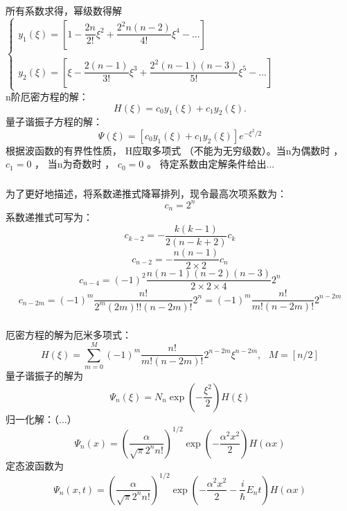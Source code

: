 \begin{frame}
	\frametitle{}
	所有系数求得，幂级数得解\\
	$\displaystyle \begin{cases}
		y_1(\xi)  = [1- \dfrac{2n}{2!} \xi^2+ \dfrac{2^2n(n-2)}{4!} \xi^4 -...  ] \\
		\\
		y_2(\xi)  = [\xi- \dfrac{2(n-1)}{3!} \xi^3+ \dfrac{2^2(n-1)(n-3) }{5!}\xi^5 -...  ]
	\end{cases}$ \\
	n阶厄密方程的解：
	\begin{equation*}
		H(\xi) =c_0y_1(\xi)+c_1 y_2(\xi).
	\end{equation*}   
 	 量子谐振子方程的解：
	\begin{equation*}
		\Psi(\xi) = [c_0y_1(\xi)+c_1 y_2(\xi) ]e^{-\xi^2/2 }  
  	\end{equation*}   
  	根据波函数的有界性性质， H应取多项式 （不能为无穷级数）。当n为偶数时 ， $c_1=0$ ， 当n为奇数时 ， $c_0=0$ 。 待定系数由定解条件给出...
\end{frame}

\begin{frame}
	\frametitle{}
		为了更好地描述，将系数递推式降幂排列，现令最高次项系数为：
	\begin{equation*}
		c_n =2^n
	\end{equation*}  
	系数递推式可写为：
	\begin{equation*}
		c_{k-2} = -\frac{k(k-1) } { 2(n-k+2)}  c_k
	\end{equation*} 
	\begin{equation*}
		c_{n-2} = -\frac{n(n-1) } { 2\times2}  c_n
	\end{equation*} 
	\begin{equation*}
		c_{n-4} = (-1)^2 \frac{n(n-1)(n-2) (n-3) } { 2\times2\times 4}  2^n
	\end{equation*} 
		\begin{equation*}
		c_{n-2m} = (-1)^m \frac{n! } { 2^m (2m) !! (n-2m)!}  2^n =(-1)^m \frac{n! } {  m ! (n-2m)!}  2^{n-2m} 
	\end{equation*} 
\end{frame}

\begin{frame}
	\frametitle{}
	厄密方程的解为厄米多项式：
	\begin{equation*}
		H(\xi) =\sum_{m=0}^{M}  (-1)^m \frac{n! } {  m ! (n-2m)!}  2^{n-2m} \xi^{n-2m} ,  ~~~ M=[n/2]
	\end{equation*}   
	量子谐振子的解为
	\begin{equation*}
		\Psi_n(\xi) = N_n \exp(-\frac{\xi ^2}{2}) H(\xi) 
	\end{equation*}   
	归一化解：（...）
	\begin{equation*}
		\Psi_n(x) = \left( \frac{\alpha}{\sqrt{\pi} 2^n n!}  \right) ^{1/2}  \exp(-\frac{ \alpha^2 x^2}{2}) H( \alpha x) 
	\end{equation*}  
	定态波函数为
	\begin{equation*}
		\Psi_n(x,t) = \left( \frac{\alpha}{\sqrt{\pi} 2^n n!}  \right) ^{1/2}  \exp(-\frac{ \alpha^2 x^2}{2} -\frac{i}{\hbar} E_n t ) H( \alpha x) 
	\end{equation*}  	
\end{frame}

